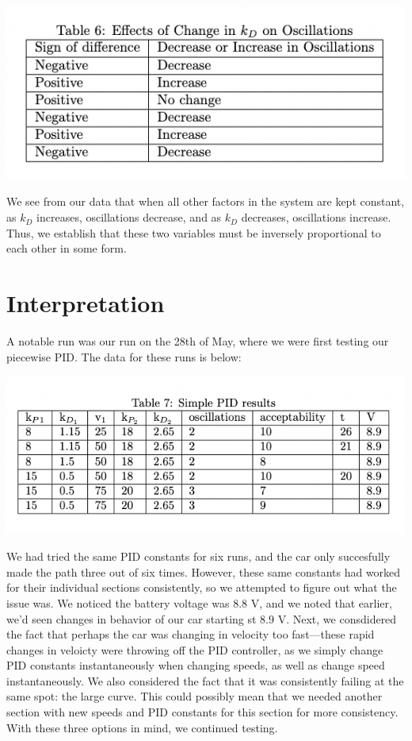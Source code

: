 \documentclass[12pt]{article}
\begin{document}
\begin{multicols}{2}
\begin{center}
    \includegraphics*[scale=0.5]{Table6.png}
\end{center}

We see from our data that when all other factors in the system are kept constant,
as $k_D$ increases, oscillations decrease, and as $k_D$ decreases, oscillations increase. Thus, we establish that these two variables must be inversely proportional to each other in some form.


\section*{Interpretation}
A notable run was our run on the 28th of May, where we were first testing our piecewise PID. The data for these runs is below:
\begin{center}
    \includegraphics*[scale=0.5]{Table7.png}
\end{center}
We had tried the same PID constants for six runs, and the car only succesfully made the path three out of six times. However, these same constants had worked for their individual sections consistently,
so we attempted to figure out what the issue was. We noticed the battery voltage was $8.8$ V, and we noted that earlier, we'd seen changes in behavior of our car starting st $8.9$ V. 
Next, we consdidered the fact that perhaps the car was changing in velocity too fast—these rapid changes in veloicty were throwing off the PID controller, as we simply change PID constants instantaneously when
changing speeds, as well as change speed instantaneously. We also considered the fact that it was consistently failing at the same spot: the large curve. This could possibly mean that we needed another section with
new speeds and PID constants for this section for more consistency. With these three options in mind, we continued testing. 


\end{multicols}
\end{document}
